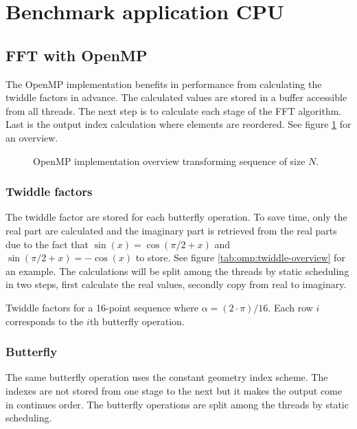 \section{Benchmark application CPU}

\subsection{FFT with OpenMP}

The OpenMP implementation benefits in performance from calculating the twiddle factors in advance. The calculated values are stored in a buffer accessible from all threads. The next step is to calculate each stage of the FFT algorithm. Last is the output index calculation where elements are reordered. See figure \ref{fig:omp:overview} for an overview.

\begin{figure}
	\centering
	
	\caption{OpenMP implementation overview transforming sequence of size $N$.}
	\label{fig:omp:overview}
\end{figure}

\subsubsection{Twiddle factors}

The twiddle factor are stored for each butterfly operation. To save time, only the real part are calculated and the imaginary part is retrieved from the real parts due to the fact that $\sin(x) = \cos(\pi/2 + x)$ and $\sin(\pi/2 + x) = -\cos(x)$ to store. See figure \ref{tab:omp:twiddle-overview} for an example. The calculations will be split among the threads by static scheduling in two steps, first calculate the real values, secondly copy from real to imaginary.

\begin{table}[h!]
	\centering
	
	\caption{Twiddle factors for a 16-point sequence where $\alpha = (2 \cdot \pi) / 16$. Each row $i$ corresponds to the $i$th butterfly operation.}
	\label{tab:omp:twiddle-overview}
\end{table}

\subsubsection{Butterfly}

The same butterfly operation uses the constant geometry index scheme. The indexes are not stored from one stage to the next but it makes the output come in continues order. The butterfly operations are split among the threads by static scheduling.

